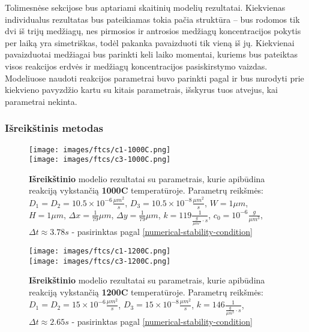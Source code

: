 Tolimesnėse sekcijose bus aptariami skaitinių modelių rezultatai. Kiekvienas individualus rezultatas bus pateikiamas tokia pačia struktūra -- bus rodomos tik dvi iš trijų medžiagų, nes pirmosios ir antrosios medžiagų koncentracijos pokytis per laiką yra simetriškas, todėl pakanka pavaizduoti tik vieną iš jų. Kiekvienai pavaizduotai medžiagai bus parinkti keli laiko momentai, kuriems bus pateiktas visos reakcijos erdvės ir medžiagų koncentracijos pasiskirstymo vaizdas. Modeliuose naudoti reakcijos parametrai buvo parinkti pagal \cite{mackeviciusCloserLookComputer2012} ir bus nurodyti prie kiekvieno pavyzdžio kartu su kitais parametrais, išskyrus tuos atvejus, kai parametrai nekinta.

\newpage

\subsubsection*{Išreikštinis metodas}

\begin{figure}[h!]
  \centering
  \texttt{[image: images/ftcs/c1-1000C.png]} \\ 
  \texttt{[image: images/ftcs/c3-1000C.png]}
  \caption{\textbf{Išreikštinio} modelio rezultatai su parametrais, kurie apibūdina reakciją vykstančią \textbf{1000\degree C} temperatūroje. Parametrų reikšmės: $D_1 = D_2 = 10.5\times 10^{-6} \frac{\mu m^2}{s}$, $D_3 = 10.5\times 10^{-8} \frac{\mu m^2}{s}$, $W = 1\mu m$, $H = 1\mu m$, $\Delta x = \frac{1}{79}\mu m$, $\Delta y = \frac{1}{79} \mu m$, $k = 119 \frac{1}{ \frac{g}{\mu m^3}\cdot s}$, $c_0 = 10^{-6} \frac{g}{\mu m^3}$, $\Delta t \approx 3.78s$ - pasirinktas pagal \eqref{numerical-stability-condition} }
  \label{fig:ftcs-result-T-1000}
\end{figure}

\begin{figure}[h!]
  \centering
  \texttt{[image: images/ftcs/c1-1200C.png]} \\ 
  \texttt{[image: images/ftcs/c3-1200C.png]}
  \caption{\textbf{Išreikštinio} modelio rezultatai su parametrais, kurie apibūdina reakciją vykstančią \textbf{1200\degree C} temperatūroje. Parametrų reikšmės: $D_1 = D_2 = 15\times 10^{-6} \frac{\mu m^2}{s}$, $D_3 = 15\times 10^{-8} \frac{\mu m^2}{s}$, $k = 146 \frac{1}{ \frac{g}{\mu m^3}\cdot s}$, $\Delta t \approx 2.65s$ - pasirinktas pagal \eqref{numerical-stability-condition} }
  \label{fig:ftcs-result-T-1200}
\end{figure}

